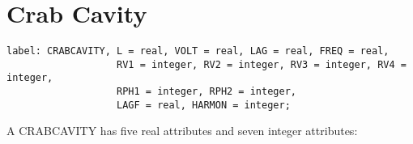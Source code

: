 
\section{Crab Cavity}
\label{sec:crab_cavity}


\begin{verbatim}
label: CRABCAVITY, L = real, VOLT = real, LAG = real, FREQ = real,
                   RV1 = integer, RV2 = integer, RV3 = integer, RV4 = integer, 
                   RPH1 = integer, RPH2 = integer, 
                   LAGF = real, HARMON = integer;                 
\end{verbatim} 


A CRABCAVITY has five real attributes and seven integer attributes: 

